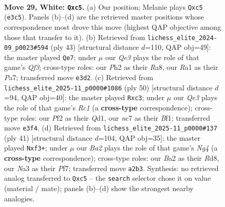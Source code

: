 \documentclass[11pt]{article}
\begin{document}
\begin{figure}[p]
\label{fig:thought-m54}
\end{figure}

\clearpage

\begin{figure}[p]\centering
\begin{subfigure}{0.46\textwidth}\centering
\resizebox{\linewidth}{!}{%
\newchessgame
\chessboard[
  setfen={2bq3r/2n2pk1/p5p1/n1b1p2p/P3P3/N1PPQ2N/Br2RPPP/R4K2 w - - 0 29},
  showmover=false,
  pgfstyle=straightmove, color=movearrow, markmove={e3-c5}
]}
\caption{}
\end{subfigure}\hfill
\begin{subfigure}{0.46\textwidth}\centering
\resizebox{\linewidth}{!}{%
\newchessgame
\chessboard[
  setfen={r3r3/p4pk1/2pR1qpp/1p2p3/n3P1b1/Q4N2/PPP1BPPP/4R1K1 b - - 6 22},
  showmover=false,
  pgfstyle=straightmove, color=movearrow, markmove={f6-e7}
]}
\caption{}
\end{subfigure}
\\[4pt]
\begin{subfigure}{0.46\textwidth}\centering
\resizebox{\linewidth}{!}{%
\newchessgame
\chessboard[
  setfen={3qbrk1/1p4p1/1n1Np2b/3pP2P/Pp1P1p2/1Pr2N2/6K1/2RQ1B1R w - - 2 26},
  showmover=false,
  pgfstyle=straightmove, color=movearrow, markmove={c1-c3}
]}
\caption{}
\end{subfigure}\hfill
\begin{subfigure}{0.46\textwidth}\centering
\resizebox{\linewidth}{!}{%
\newchessgame
\chessboard[
  setfen={3rr1k1/1p1q1pp1/2p2B1p/p1Pp1bn1/P4N2/1P3B2/2P2PPP/R1Q1R1K1 b - - 0 21},
  showmover=false,
  pgfstyle=straightmove, color=movearrow, markmove={g5-f3}
]}
\caption{}
\end{subfigure}
\caption{\textbf{Move 29, White: \texttt{Qxc5}.} (a) Our position; Melanie plays \texttt{Qxc5} (\texttt{e3c5}). Panels (b)--(d) are the retrieved master positions whose correspondence most drove this move (highest QAP objective among those that transfer to it). (b) Retrieved from \texttt{lichess\_elite\_2024-09\_p0023\#594} (ply 43) [structural distance $d$=110, QAP obj=49]: the master played \texttt{Qe7}; under $\mu$ our \emph{Qe3} plays the role of that game's \emph{Qf3}; cross-type roles: our \emph{P}h2 as their \emph{R}a8, our \emph{R}a1 as their \emph{P}a7; transferred move \texttt{e3d2}. (c) Retrieved from \texttt{lichess\_elite\_2025-11\_p0000\#1086} (ply 50) [structural distance $d$=94, QAP obj=40]: the master played \texttt{Rxc3}; under $\mu$ our \emph{Qe3} plays the role of that game's \emph{Rc1} (a \textbf{cross-type} correspondence); cross-type roles: our \emph{P}f2 as their \emph{Q}d1, our \emph{n}c7 as their \emph{B}f1; transferred move \texttt{e3f4}. (d) Retrieved from \texttt{lichess\_elite\_2025-11\_p0000\#137} (ply 41) [structural distance $d$=104, QAP obj=35]: the master played \texttt{Nxf3+}; under $\mu$ our \emph{Ba2} plays the role of that game's \emph{Ng4} (a \textbf{cross-type} correspondence); cross-type roles: our \emph{B}a2 as their \emph{R}d8, our \emph{N}a3 as their \emph{P}f7; transferred move \texttt{a2b3}. Synthesis: no retrieved analog transferred to \texttt{Qxc5} -- the \texttt{search} selector chose it on value (material / mate); panels (b)--(d) show the strongest nearby analogies.}

\end{figure}
\end{document}
